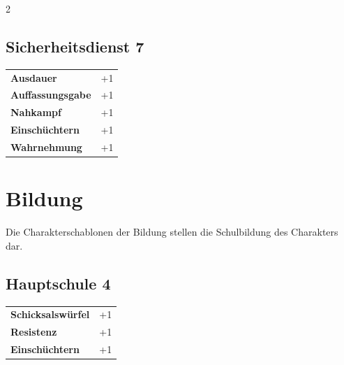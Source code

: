 \begin{multicols}{2}
\begin{tcolorbox}
\end{tcolorbox}

\begin{tcolorbox}
    \subsection*{Sicherheitsdienst \hfill \small{7 }}
    \tcblower




\begin{tabular}{@{}ll@{}}
    \textbf{Ausdauer} & +1\\
    \textbf{Auffassungsgabe} & +1\\
    \textbf{Nahkampf} & +1\\
    \textbf{Einschüchtern} & +1\\
    \textbf{Wahrnehmung} & +1\\
\end{tabular}


\end{tcolorbox}

\section{Bildung}

Die Charakterschablonen der Bildung stellen die Schulbildung des Charakters dar.

\begin{tcolorbox}
    \subsection*{Hauptschule \hfill \small{4 }}
    \tcblower




\begin{tabular}{@{}ll@{}}
    \textbf{Schicksalswürfel} & +1\\
    \textbf{Resistenz} & +1\\
    \textbf{Einschüchtern} & +1\\
\end{tabular}


\end{tcolorbox}
\end{multicols}
